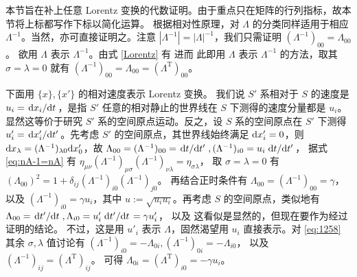 本节旨在补上任意 Lorentz 变换的代数证明。由于重点只在矩阵的行列指标，故本节将上标都写作下标以简化运算。
根据相对性原理，对 $\Lambda$ 的分类同样适用于相应 $\Lambda^{-1}$。当然，亦可直接证明之。注意 $|\Lambda^{-1}|=|\Lambda|^{-1}$，我们只需证明 $(\Lambda^{-1})_{00}=\Lambda_{00}$。
欲用 $\Lambda$ 表示 $\Lambda^{-1}$。由式 \eqref{Lorentz} 有
进而
此即用 $\Lambda$ 表示 $\Lambda^{-1}$ 的方法，取其 $\sigma=\lambda=0$ 就有 $(\Lambda^{-1})_{00}=\Lambda_{00}=(\Lambda^\mathrm{T})_{00}$。

下面用 $\{x\},\{x'\}$ 的相对速度表示 Lorentz 变换。
我们说 $S'$ 系相对于 $S$ 的速度是 $u_i=\dv*{x_i}{t}$，是指 $S'$ 任意的相对静止的世界线在 $S$ 下测得的速度分量都是 $u_i$。显然这等价于研究 $S'$ 系的空间原点运动。反之，设 $S$ 系的空间原点在 $S'$ 下测得 $u'_i=\dv*{x'_i}{t'}$。先考虑 $S'$ 的空间原点，其世界线始终满足 $\dd x'_i=0$，则 $\dd x_\lambda=(\Lambda^{-1})_{\lambda 0}\dd x'_0$，故 $\Lambda_{00}=(\Lambda^{-1})_{00}=\dv*{t}{t'},(\Lambda^{-1})_{i0}=u_i\dv*{t}{t'}$，
    据式 \eqref{eq:nA-1=nA} 有 $\eta_{\mu\nu}(\Lambda^{-1})_{\mu\sigma}(\Lambda^{-1})_{\nu\lambda}={\eta}_{\sigma\lambda}$，    取 $\sigma=\lambda=0$ 有 $(\Lambda_{00})^2=1+\delta_{ij}(\Lambda^{-1})_{i0}(\Lambda^{-1})_{j0}$。
    再结合正时条件有 $\Lambda_{00}=(\Lambda^{-1})_{00}=\gamma$，以及 $(\Lambda^{-1})_{i0}=\gamma u_i$，其中 $u:=\sqrt{u_i u_i}$。再考虑 $S$ 的空间原点，类似地有 $\Lambda_{00}=\dv*{t'}{t},\Lambda_{i0}=u'_i \dv*{t'}{t}=\gamma u'_i$，
    以及
    这看似是显然的，但现在要作为经过证明的结论。
    不过，这是用 $u'_i$ 表示 $\Lambda$，固然渴望用 $u_i$ 直接表示。对 \eqref{eq:1258} 其余 $\sigma,\lambda$ 值讨论有 $(\Lambda^{-1})_{i0}=-\Lambda_{0i},(\Lambda^{-1})_{0i} =-\Lambda_{i0}$，
    以及 $(\Lambda^{-1})_{ij}=(\Lambda^\mathrm{T})_{ij}$。
    可得 $\Lambda_{0i}=(\Lambda^\mathrm{T})_{i0}=-\gamma u_i$。

